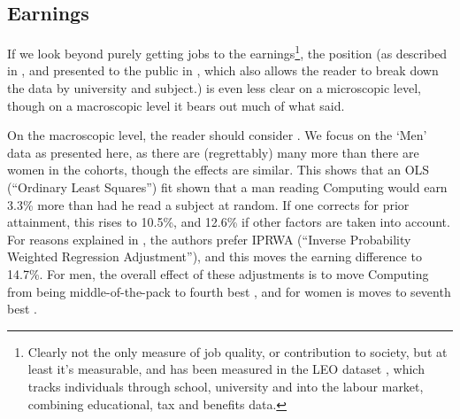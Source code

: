\documentclass[sigconf]{acmart}
\begin{document}
\subsection{Earnings}
If we look beyond purely getting jobs to the earnings\footnote{Clearly not the only measure of job quality, or contribution to society, but at least it's measurable, and has been measured in the LEO dataset \cite{DfE2017a}, which tracks individuals through school, university and into the labour market, combining educational, tax and benefits data.}, the position (as described in \cite{DfE2018d}, and presented to the public in \cite{BBC2018f}, which also allows the reader to break down the data by university and subject.) is even less clear on a microscopic level, though on a macroscopic level it bears out much of what \cite{Shadbolt2016a} said.

On the macroscopic level, the reader should consider \cite[Table 5]{DfE2018d}. We focus on the `Men' data as presented here, as there are (regrettably) many more than there are women in the cohorts, though the effects are similar. This shows that an OLS (``Ordinary Least Squares'') fit shown that a man reading Computing would earn 3.3\% more than had he read a subject at random. If one corrects for prior attainment, this rises to 10.5\%, and 12.6\% if other factors are taken into account. For reasons explained in \cite[\S4.2]{DfE2018d}, the authors prefer IPRWA (``Inverse Probability Weighted Regression Adjustment''), and this moves the earning difference to 14.7\%. For men, the overall effect of these adjustments is to move Computing from being middle-of-the-pack \cite[Figure 15]{DfE2018d} to fourth best  \cite[Figure 17]{DfE2018d}, and for women is moves to seventh best  \cite[Figure 16]{DfE2018d}.
\end{document}
